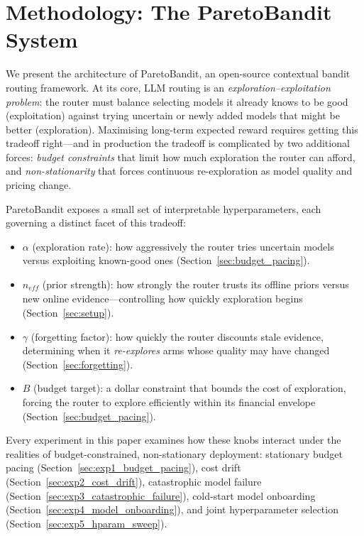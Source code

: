 \section{Methodology: The ParetoBandit System}
\label{sec:methodology}

We present the architecture of ParetoBandit, an open-source contextual bandit routing framework.  At its core, LLM routing is an \emph{exploration--exploitation problem}: the router must balance selecting models it already knows to be good (exploitation) against trying uncertain or newly added models that might be better (exploration).  Maximising long-term expected reward requires getting this tradeoff right---and in production the tradeoff is complicated by two additional forces: \emph{budget constraints} that limit how much exploration the router can afford, and \emph{non-stationarity} that forces continuous re-exploration as model quality and pricing change.

ParetoBandit exposes a small set of interpretable hyperparameters, each governing a distinct facet of this tradeoff:
\begin{itemize}[nosep,leftmargin=*]
  \item $\alpha$ (exploration rate): how aggressively the router tries uncertain models versus exploiting known-good ones (Section~\ref{sec:budget_pacing}).
  \item $n_\mathit{eff}$ (prior strength): how strongly the router trusts its offline priors versus new online evidence---controlling how quickly exploration begins (Section~\ref{sec:setup}).
  \item $\gamma$ (forgetting factor): how quickly the router discounts stale evidence, determining when it \emph{re-explores} arms whose quality may have changed (Section~\ref{sec:forgetting}).
  \item $B$ (budget target): a dollar constraint that bounds the cost of exploration, forcing the router to explore efficiently within its financial envelope (Section~\ref{sec:budget_pacing}).
\end{itemize}
Every experiment in this paper examines how these knobs interact under the realities of budget-constrained, non-stationary deployment: stationary budget pacing (Section~\ref{sec:exp1_budget_pacing}), cost drift (Section~\ref{sec:exp2_cost_drift}), catastrophic model failure (Section~\ref{sec:exp3_catastrophic_failure}), cold-start model onboarding (Section~\ref{sec:exp4_model_onboarding}), and joint hyperparameter selection (Section~\ref{sec:exp5_hparam_sweep}).

